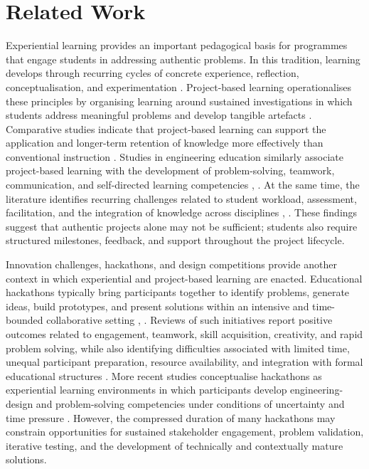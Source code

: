\documentclass[runningheads]{llncs}
\begin{document}
\section{Related Work}

Experiential learning provides an important pedagogical basis for programmes that engage students in addressing authentic problems. In this tradition, learning develops through recurring cycles of concrete experience, reflection, conceptualisation, and experimentation \cite{b4}\cite{b5}\cite{b14}. Project-based learning operationalises these principles by organising learning around sustained investigations in which students address meaningful problems and develop tangible artefacts \cite{b15}. Comparative studies indicate that project-based learning can support the application and longer-term retention of knowledge more effectively than conventional instruction \cite{b16}. Studies in engineering education similarly associate project-based learning with the development of problem-solving, teamwork, communication, and self-directed learning competencies \cite{b17}, \cite{b18}. At the same time, the literature identifies recurring challenges related to student workload, assessment, facilitation, and the integration of knowledge across disciplines \cite{b17}, \cite{b18}. These findings suggest that authentic projects alone may not be sufficient; students also require structured milestones, feedback, and support throughout the project lifecycle.

Innovation challenges, hackathons, and design competitions provide another context in which experiential and project-based learning are enacted. Educational hackathons typically bring participants together to identify problems, generate ideas, build prototypes, and present solutions within an intensive and time-bounded collaborative setting \cite{b19}, \cite{b20}. Reviews of such initiatives report positive outcomes related to engagement, teamwork, skill acquisition, creativity, and rapid problem solving, while also identifying difficulties associated with limited time, unequal participant preparation, resource availability, and integration with formal educational structures \cite{b19}. More recent studies conceptualise hackathons as experiential learning environments in which participants develop engineering-design and problem-solving competencies under conditions of uncertainty and time pressure \cite{b21}. However, the compressed duration of many hackathons may constrain opportunities for sustained stakeholder engagement, problem validation, iterative testing, and the development of technically and contextually mature solutions.
\end{document}
